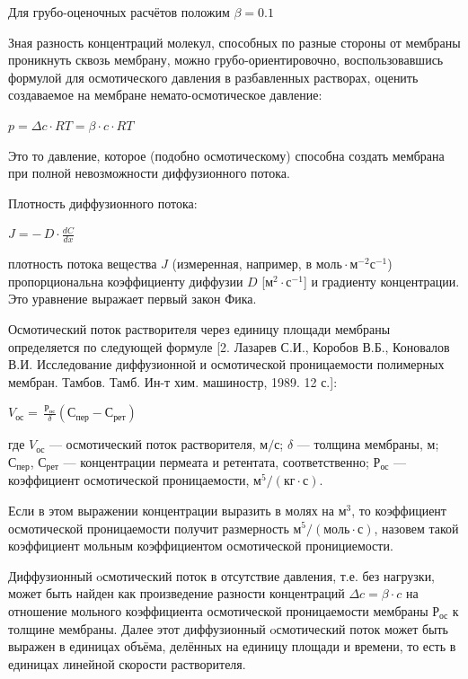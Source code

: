 \documentclass[11pt]{article}
\begin{document}
    Для грубо-оценочных расчётов положим $\beta = 0.1$

Зная разность концентраций молекул, способных по разные стороны от
мембраны проникнуть сквозь мембрану, можно грубо-ориентировочно,
воспользовавшись формулой для осмотического давления в разбавленных
растворах, оценить создаваемое на мембране немато-осмотическое давление:

\(p = \Delta c \cdot RT = \beta \cdot c \cdot RT\)

Это то давление, которое (подобно осмотическому) способна создать
мембрана при полной невозможности диффузионного потока.



    Плотность диффузионного потока:

\(J = -\,D \cdot \frac{dC}{dx}\)

плотность потока вещества \({\displaystyle J}\) (измеренная, например, в
\(моль \cdot м^{-2} с^{-1}\)) пропорциональна коэффициенту диффузии
\({\displaystyle D}\) {[}\(м^2·с^{-1}\){]} и градиенту концентрации. Это
уравнение выражает первый закон Фика.



    Осмотический поток растворителя через единицу площади мембраны
определяется по следующей формуле {[}2. Лазарев С.И., Коробов В.Б.,
Коновалов В.И. Исследование диффузионной и осмотической проницаемости
полимерных мембран. Тамбов. Тамб. Ин-т хим. машиностр, 1989. 12 с.{]}:

\(V_{ос} =\,\frac{Р_{ос}}{\delta}\left(С_{пер}-С_{рет}\right)\)

где \(V_{ос}\) --- осмотический поток растворителя, \(м/с\); \(\delta\)
--- толщина мембраны, \(м\); \(С_{пер}\), \(С_{рет}\) --- концентрации
пермеата и ретентата, соответственно; \(Р_{ос}\) --- коэффициент
осмотической проницаемости, \(м^5/\left(кг \cdot с\right)\).

Если в этом выражении концентрации выразить в молях на \(м^3\), то
коэффициент осмотической проницаемости получит размерность
\(м^5/\left(моль \cdot с\right)\), назовем такой коэффициент мольным
коэффициентом осмотической пронициемости.



    Диффузионный oсмотический поток в отсутствие давления, т.е. без
нагрузки, может быть найден как произведение разности концентраций
\(\Delta c = \beta \cdot c\) на отношение мольного коэффициента
осмотической проницаемости мембраны \(Р_{ос}\) к толщине мембраны. Далее
этот диффузионный oсмотический поток может быть выражен в единицах
объёма, делённых на единицу площади и времени, то есть в единицах
линейной скорости растворителя.
\end{document}
